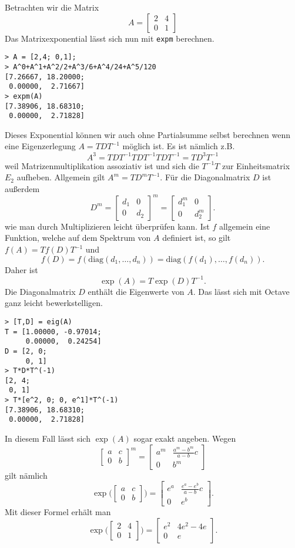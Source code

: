 \documentclass[a4paper,11pt,fleqn]{article}
\begin{document}
Betrachten wir die Matrix
\[A=\begin{bmatrix}
2 & 4\\
0 & 1
\end{bmatrix}\]
Das Matrixexponential lässt sich nun mit \texttt{expm} berechnen.
\begin{verbatim}
> A = [2,4; 0,1];
> A^0+A^1+A^2/2+A^3/6+A^4/24+A^5/120
[7.26667, 18.20000;
 0.00000,  2.71667]
> expm(A)
[7.38906, 18.68310;
 0.00000,  2.71828]
\end{verbatim}
Dieses Exponential können wir auch ohne Partialsumme selbst berechnen
wenn eine Eigenzerlegung \(A=TDT^{-1}\) möglich ist. Es ist nämlich z.B.
\[A^3 = TDT^{-1}TDT^{-1}TDT^{-1} = TD^3T^{-1}\]
weil Matrizenmultiplikation assoziativ ist und sich die \(T^{-1}T\)
zur Einheitsmatrix \(E_2\) aufheben. Allgemein gilt \(A^m=TD^mT^{-1}\).
Für die Diagonalmatrix \(D\) ist außerdem
\[D^m = \begin{bmatrix}
d_1 & 0\\
0 & d_2
\end{bmatrix}^m
= \begin{bmatrix}
d_1^m & 0\\
0 & d_2^m
\end{bmatrix}.\]
wie man durch Multiplizieren leicht überprüfen kann.
Ist \(f\) allgemein eine Funktion, welche auf dem Spektrum von
\(A\) definiert ist, so gilt \(f(A)=Tf(D)T^{-1}\) und
\[f(D) = f(\mathrm{diag}(d_1,\ldots,d_n))
= \mathrm{diag}(f(d_1),\ldots,f(d_n)).\]
Daher ist
\[\exp(A) = T\exp(D)T^{-1}.\]
Die Diagonalmatrix \(D\) enthält die Eigenwerte von \(A\).
Das lässt sich mit Octave ganz leicht bewerkstelligen.
\begin{verbatim}
> [T,D] = eig(A)
T = [1.00000, -0.97014;
     0.00000,  0.24254]
D = [2, 0;
     0, 1]
> T*D*T^(-1)
[2, 4;
 0, 1]
> T*[e^2, 0; 0, e^1]*T^(-1)
[7.38906, 18.68310;
 0.00000,  2.71828]
\end{verbatim}
In diesem Fall lässt sich \(\exp(A)\) sogar exakt angeben.
Wegen
\[\begin{bmatrix}
a & c\\
0 & b
\end{bmatrix}^m
=\begin{bmatrix}
a^m & \frac{a^m-b^m}{a-b}c\\
0 & b^m
\end{bmatrix}
\]
gilt nämlich
\[\exp\bigg(\begin{bmatrix}
a & c\\
0 & b
\end{bmatrix}\bigg)
=\begin{bmatrix}
e^a & \frac{e^a-e^b}{a-b}c\\
0 & e^b
\end{bmatrix}.
\]
Mit dieser Formel erhält man
\[\exp\bigg(\begin{bmatrix}
2 & 4\\
0 & 1
\end{bmatrix}\bigg)
=\begin{bmatrix}
e^2 & 4e^2-4e\\
0 & e
\end{bmatrix}.
\]
\end{document}

